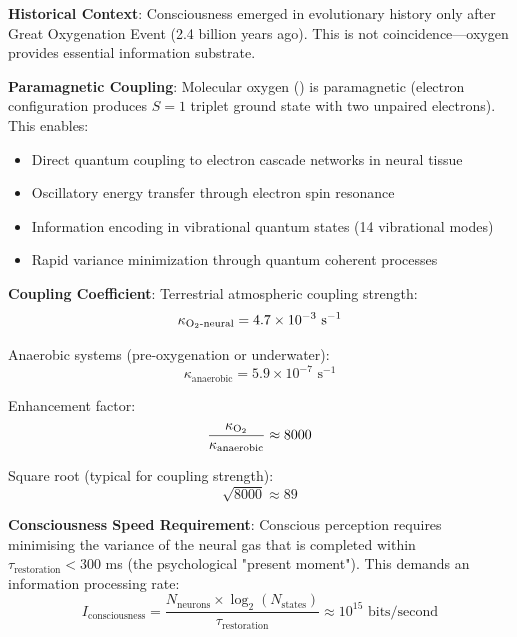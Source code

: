 \documentclass[11pt,onecolumn]{article}
\begin{document}
\textbf{Historical Context}: Consciousness emerged in evolutionary history only after Great Oxygenation Event (2.4 billion years ago). This is not coincidence---oxygen provides essential information substrate.

\textbf{Paramagnetic Coupling}: Molecular oxygen () is paramagnetic (electron configuration produces $S=1$ triplet ground state with two unpaired electrons). This enables:
\begin{itemize}
\item Direct quantum coupling to electron cascade networks in neural tissue
\item Oscillatory energy transfer through electron spin resonance
\item Information encoding in vibrational quantum states (14 vibrational modes)
\item Rapid variance minimization through quantum coherent processes
\end{itemize}

\textbf{Coupling Coefficient}: Terrestrial atmospheric  coupling strength:
\begin{equation}
\kappa_{\ce{O2}\text{-neural}} = 4.7 \times 10^{-3} \text{ s}^{-1}
\end{equation}

Anaerobic systems (pre-oxygenation or underwater):
\begin{equation}
\kappa_{\text{anaerobic}} = 5.9 \times 10^{-7} \text{ s}^{-1}
\end{equation}

Enhancement factor:
\begin{equation}
\frac{\kappa_{\ce{O2}}}{\kappa_{\text{anaerobic}}} \approx 8000
\end{equation}

Square root (typical for coupling strength):
\begin{equation}
\sqrt{8000} \approx 89
\end{equation}

\textbf{Consciousness Speed Requirement}: Conscious perception requires minimising the variance of the neural gas that is completed within $\tau_{\text{restoration}} < 300$ ms (the psychological "present moment"). This demands an information processing rate:
\begin{equation}
I_{\text{consciousness}} = \frac{N_{\text{neurons}} \times \log_2(N_{\text{states}})}{\tau_{\text{restoration}}} \approx 10^{15} \text{ bits/second}
\end{equation}
\end{document}

